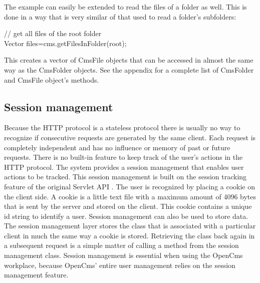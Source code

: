 The example can easily be extended to read the files of a folder as
well. This is done in a way that is very similar of that used to read a
folder's subfolders:

\begin{java}
// get all files of the root folder\\
Vector files=cms.getFilesInFolder(root);\\
\end{java}

This creates a vector of CmsFile objects that can be accessed in almost
the same way as the CmsFolder objects. See the appendix for a complete
list of CmsFolder and CmsFile object's methods.

\subsection{Session management}

Because the HTTP protocol is a stateless protocol there is usually no
way to recognize if consecutive requests are generated by the same
client. Each request is completely independent and has no influence or
memory of past or future requests. There is no built-in feature to keep
track of the user's actions in the HTTP protocol. The system provides a
session management that enables user actions to be tracked. This
session management is built on the session tracking feature of the
original Servlet API . The user is recognized by placing a cookie on
the client side.  A cookie is  a little text file with a maximum amount
of 4096 bytes that is sent by the server and stored on the client. This
cookie contains a unique id string to identify a user. Session
management can also be used to store data. The session management layer
stores the class that is associated with a particular client in much
the same way a cookie is stored. Retrieving the class back again in a
subsequent request is a simple matter of calling a method from the
session management class.
Session management is essential when using the OpenCms workplace,
because OpenCms' entire user management relies on the session
management feature.

